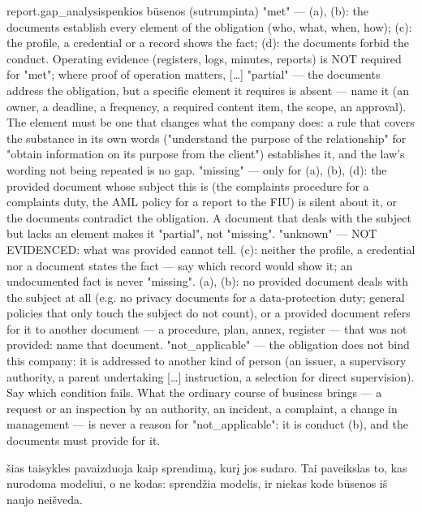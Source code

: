 \begin{promptexcerpt}{report.gap_analysis}{penkios būsenos (sutrumpinta)}
    "met" — (a), (b): the documents establish every element of the obligation (who,
      what, when, how); (c): the profile, a credential or a record shows the fact;
      (d): the documents forbid the conduct. Operating evidence (registers, logs,
      minutes, reports) is NOT required for "met"; where proof of operation matters,
[…]
    "partial" — the documents address the obligation, but a specific element it
      requires is absent — name it (an owner, a deadline, a frequency, a required
      content item, the scope, an approval). The element must be one that changes
      what the company does: a rule that covers the substance in its own words
      ("understand the purpose of the relationship" for "obtain information on its
      purpose from the client") establishes it, and the law's wording not being
      repeated is no gap.
    "missing" — only for (a), (b), (d): the provided document whose subject this is
      (the complaints procedure for a complaints duty, the AML policy for a report to
      the FIU) is silent about it, or the documents contradict the obligation. A
      document that deals with the subject but lacks an element makes it "partial",
      not "missing".
    "unknown" — NOT EVIDENCED: what was provided cannot tell. (c): neither the
      profile, a credential nor a document states the fact — say which record would
      show it; an undocumented fact is never "missing". (a), (b): no provided document
      deals with the subject at all (e.g. no privacy documents for a data-protection
      duty; general policies that only touch the subject do not count), or a provided
      document refers for it to another document — a procedure, plan, annex, register
      — that was not provided: name that document.
    "not_applicable" — the obligation does not bind this company: it is addressed to
      another kind of person (an issuer, a supervisory authority, a parent undertaking
[…]
      instruction, a selection for direct supervision). Say which condition fails.
      What the ordinary course
      of business brings — a request or an inspection by an authority, an incident, a
      complaint, a change in management — is never a reason for "not_applicable": it
      is conduct (b), and the documents must provide for it.
\end{promptexcerpt}

 šias taisykles pavaizduoja kaip sprendimą, kurį jos sudaro. Tai
paveikslas to, kas nurodoma modeliui, o ne kodas: sprendžia modelis, ir niekas kode būsenos iš
naujo neišveda.


